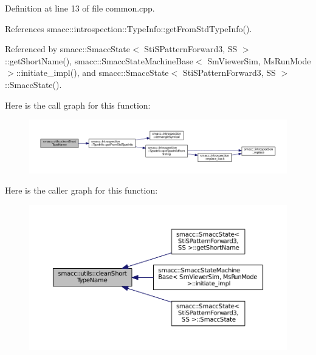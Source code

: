 Definition at line 13 of file common.\+cpp.



References smacc\+::introspection\+::\+Type\+Info\+::get\+From\+Std\+Type\+Info().



Referenced by smacc\+::\+Smacc\+State$<$ Sti\+S\+Pattern\+Forward3, S\+S $>$\+::get\+Short\+Name(), smacc\+::\+Smacc\+State\+Machine\+Base$<$ Sm\+Viewer\+Sim, Ms\+Run\+Mode $>$\+::initiate\+\_\+impl(), and smacc\+::\+Smacc\+State$<$ Sti\+S\+Pattern\+Forward3, S\+S $>$\+::\+Smacc\+State().




Here is the call graph for this function\+:
\nopagebreak
\begin{figure}[H]
\begin{center}
\leavevmode
\includegraphics[width=350pt]{namespacesmacc_1_1utils_aacd1975bb7cd9bec4b50e111a2ae7edb_cgraph}
\end{center}
\end{figure}




Here is the caller graph for this function\+:
\nopagebreak
\begin{figure}[H]
\begin{center}
\leavevmode
\includegraphics[width=350pt]{namespacesmacc_1_1utils_aacd1975bb7cd9bec4b50e111a2ae7edb_icgraph}
\end{center}
\end{figure}


